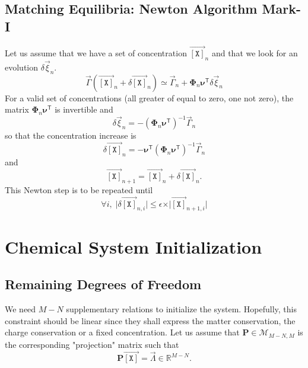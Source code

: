 \documentclass[aps,twocolumn]{revtex4}
\newcommand{\myconc}[1]{\left\lbrack #1 \right\rbrack}
\newcommand{\mychem}[1]{{\mathtt{#1}}}
\newcommand{\mymat}[1]{\boldsymbol{#1}}
\newcommand{\mytrn}[1]{{#1}^{\mathsf{T}}}
\newcommand{\myvec}[1]{\overrightarrow{#1}}
\newcommand{\vecX}{\myvec{\myconc{\mychem{X}}}}
\begin{document}
\subsection{Matching Equilibria: Newton Algorithm Mark-I}
Let us assume that we have a set of concentration $\vecX_{n}$ and that we look for an evolution $\delta\vec{\xi}_{n}$.
\begin{equation}
	\vec{\Gamma}\left(\vecX_{n}+\delta\vecX_{n}\right) \simeq \vec{\Gamma}_{n} + \mymat{\Phi}_n \mytrn{\mymat{\nu}} \delta\vec{\xi}_n
\end{equation}
For a valid set of concentrations (all greater of equal to zero, one not zero), the matrix $\mymat{\Phi}_n \mytrn{\mymat{\nu}}$ is invertible
and
\begin{equation}
	\delta\vec{\xi}_n = -\left(\mymat{\Phi}_n \mytrn{\mymat{\nu}}\right)^{-1} \vec{\Gamma}_{n}
\end{equation}
so that the concentration increase is
\begin{equation}
	\delta\vecX_{n} = - \mytrn{\mymat{\nu}}\left(\mymat{\Phi}_n \mytrn{\mymat{\nu}}\right)^{-1} \vec{\Gamma}_{n}
\end{equation}
and
\begin{equation}
	\vecX_{n+1} = \vecX_{n} + \delta\vecX_{n}.
\end{equation}
This Newton step is to be repeated until
\begin{equation}
	\forall i, \; \vert\delta\vecX_{n,i}\vert \leq \epsilon \times \vert\vecX_{n+1,i}\vert
\end{equation}

\section{Chemical System Initialization}
\subsection{Remaining Degrees of Freedom}
We need $M-N$ supplementary relations to initialize the system. Hopefully, this constraint should be linear
since they shall express the matter conservation, the charge conservation or a fixed concentration.
Let us assume that $\mymat{P}\in\mathcal{M}_{M-N,M}$ is the corresponding "projection" matrix such that
\begin{equation}
	\mymat{P} \vecX = \vec{\Lambda} \in \mathbb{R}^{M-N}.
\end{equation}
\end{document}
